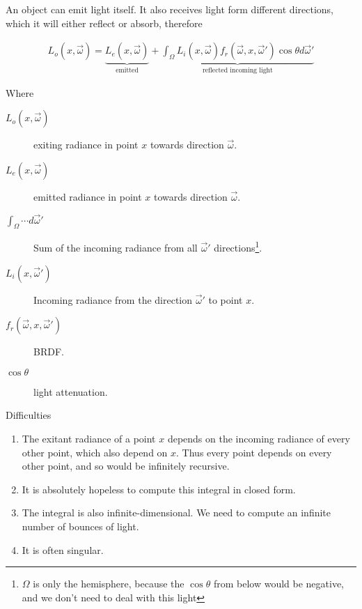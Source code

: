 \documentclass[10pt]{armath}
\numberwithin{equation}{section}
\newenvironment{Figure}
{\par\medskip\noindent\minipage{\linewidth}}
{\endminipage\par\medskip}
\theoremstyle{definition}
\begin{document}
\begin{multicols}{2}
An object can emit light itself. It also receives light form different
directions, which it will either reflect or absorb, therefore

\begin{Figure}
\begin{center}

\end{center}
\label{fig:03_3}
\end{Figure}

\begin{align*}
   L_o\left(x,\vec{\omega}\right)=\underbrace{L_e\left(x,\vec{\omega}\right)}_\text{emitted}+\underbrace{\int_\Omega
   L_i\left(x,\vec{\omega}\right)f_r\left(\vec{\omega},x,\vec{\omega}'\right)\cos\theta
 d\vec{\omega}'}_\text{reflected incoming light}
\end{align*}

Where
\begin{description}
  \item[$L_o\left(x,\vec{\omega}\right)$] exiting radiance in point $x$ towards
    direction $\vec{\omega}$.
  \item[$L_e\left(x,\vec{\omega}\right)$] emitted radiance in point $x$ towards
    direction $\vec{\omega}$.
  \item[$\int_\Omega\cdots d\vec{\omega}'$] Sum of the incoming radiance from
    all $\vec{\omega}'$ directions\footnote{$\Omega$ is only the hemisphere,
      because the $\cos\theta$ from below would be negative, and we don't need
      to deal with this light}.
  \item[$L_i\left(x,\vec{\omega}'\right)$] Incoming radiance from the direction
    $\vec{\omega}'$ to point $x$.
  \item[$f_r\left(\vec{\omega},x,\vec{\omega}'\right)$] BRDF.
  \item[$\cos\theta$] light attenuation.
\end{description}

Difficulties
\begin{enumerate}
  \item The exitant radiance of a point $x$ depends on the incoming radiance of
    every other point, which also depend on $x$. Thus every point depends on
    every other point, and so would be infinitely recursive.
  \item It is absolutely hopeless to compute this integral in closed form.
  \item The integral is also infinite-dimensional. We need to compute an
    infinite number of bounces of light.
  \item It is often singular.
\end{enumerate}


\end{multicols}
\end{document}
